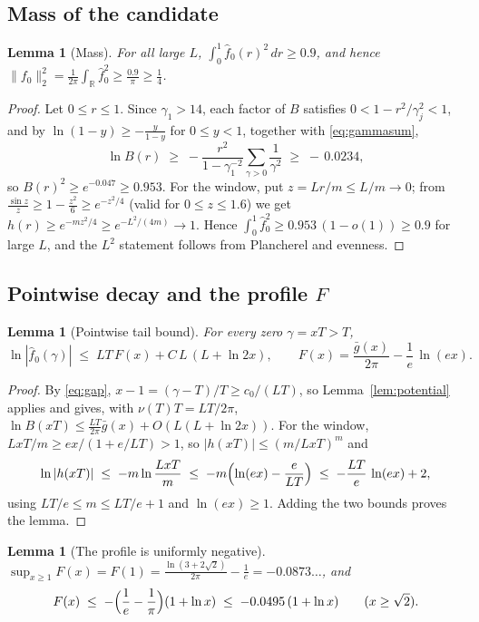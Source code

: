 ﻿\documentclass[11pt]{article}
\newtheorem{lemma}[theorem]{Lemma}
\newcommand{\R}{\mathbb{R}}
\newcommand{\fhat}{\hat f}
\begin{document}
\subsection{Mass of the candidate}

\begin{lemma}[Mass]\label{lem:mass}
For all large $L$,\; $\int_{0}^{1}\fhat_0(r)^{2}\,dr\ge0.9$, and hence
$\|f_0\|_{2}^{2}=\frac1{2\pi}\int_{\R}\fhat_0^{2}\ge\frac{0.9}{\pi}
\ge\frac14$.
\end{lemma}

\begin{proof}
Let $0\le r\le1$.  Since $\gamma_1>14$, each factor of $B$ satisfies
$0<1-r^{2}/\gamma_j^{2}<1$, and by $\ln(1-y)\ge-\frac{y}{1-y}$ for
$0\le y<1$, together with \eqref{eq:gammasum},
\[
  \ln B(r)\;\ge\;-\frac{r^{2}}{1-\gamma_1^{-2}}
  \sum_{\gamma>0}\frac{1}{\gamma^{2}}
  \;\ge\;-\,0.0234,
\]
so $B(r)^{2}\ge e^{-0.047}\ge0.953$.  For the window, put
$z=Lr/m\le L/m\to0$; from
$\frac{\sin z}{z}\ge1-\frac{z^{2}}{6}\ge e^{-z^{2}/4}$ (valid for
$0\le z\le1.6$) we get $h(r)\ge e^{-mz^{2}/4}\ge e^{-L^{2}/(4m)}\to1$.
Hence $\int_0^1\fhat_0^2\ge0.953\,(1-o(1))\ge0.9$ for large $L$, and
the $L^{2}$ statement follows from Plancherel and evenness.
\end{proof}

\subsection{Pointwise decay and the profile \texorpdfstring{$F$}{F}}

\begin{lemma}[Pointwise tail bound]\label{lem:pointwise}
For every zero $\gamma=xT>T$,
\[
  \ln|\fhat_0(\gamma)|\;\le\;LT\,F(x)+C\,L\,(L+\ln 2x),
  \qquad
  F(x)=\frac{\bar g(x)}{2\pi}-\frac{1}{e}\,\ln(ex).
\]
\end{lemma}

\begin{proof}
By \eqref{eq:gap}, $x-1=(\gamma-T)/T\ge c_0/(LT)$, so
Lemma~\ref{lem:potential} applies and gives, with $\nu(T)T=LT/2\pi$,
$\ln B(xT)\le\frac{LT}{2\pi}\bar g(x)+O(L(L+\ln2x))$.  For the window,
$LxT/m\ge ex/(1+e/LT)>1$, so $|h(xT)|\le(m/LxT)^{m}$ and
\[
  \ln|h(xT)|\;\le\;-m\ln\frac{LxT}{m}
  \;\le\;-m\Bigl(\ln(ex)-\frac{e}{LT}\Bigr)
  \;\le\;-\frac{LT}{e}\,\ln(ex)+2,
\]
using $LT/e\le m\le LT/e+1$ and $\ln(ex)\ge1$.  Adding the two bounds
proves the lemma.
\end{proof}

\begin{lemma}[The profile is uniformly negative]\label{lem:profile}
$\displaystyle\sup_{x\ge1}F(x)=F(1)=\frac{\ln(3+2\sqrt2)}{2\pi}
-\frac1e=-0.0873\ldots$, and
\[
  F(x)\;\le\;-\Bigl(\frac1e-\frac1\pi\Bigr)(1+\ln x)
  \;\le\;-0.0495\,(1+\ln x)
  \qquad(x\ge\sqrt2).
\]
\end{lemma}
\end{document}
